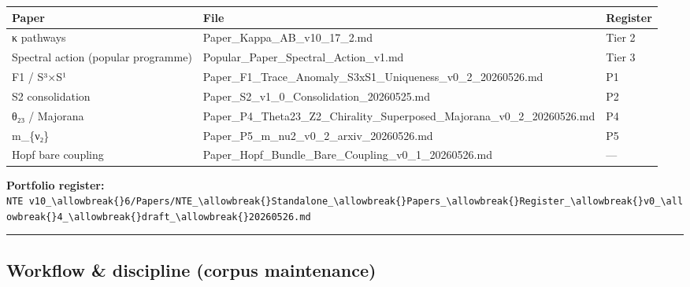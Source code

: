 \documentclass[
  11pt,
]{article}
\newcounter{none} %
\begin{document}
{\def\LTcaptype{none} %
\begin{longtable}[]{@{}
  >{\raggedright\arraybackslash}p{}
  >{\raggedright\arraybackslash}p{}
  >{\raggedright\arraybackslash}p{}@{}}
\toprule\noalign{}
\begin{minipage}[b]{\linewidth}\raggedright
Paper
\end{minipage} & \begin{minipage}[b]{\linewidth}\raggedright
File
\end{minipage} & \begin{minipage}[b]{\linewidth}\raggedright
Register
\end{minipage} \\
\midrule\noalign{}
\endhead
\bottomrule\noalign{}
\endlastfoot
κ pathways & Paper\_Kappa\_AB\_v10\_17\_2.md & Tier 2 \\
Spectral action (popular programme) &
Popular\_Paper\_Spectral\_Action\_v1.md & Tier 3 \\
F1 / S³×S¹ &
Paper\_F1\_Trace\_Anomaly\_S3xS1\_Uniqueness\_v0\_2\_20260526.md & P1 \\
S2 consolidation & Paper\_S2\_v1\_0\_Consolidation\_20260525.md & P2 \\
θ₂₃ / Majorana &
Paper\_P4\_Theta23\_Z2\_Chirality\_Superposed\_Majorana\_v0\_2\_20260526.md
& P4 \\
m\_\{ν₂\} & Paper\_P5\_m\_nu2\_v0\_2\_arxiv\_20260526.md & P5 \\
Hopf bare coupling &
Paper\_Hopf\_Bundle\_Bare\_Coupling\_v0\_1\_20260526.md & --- \\
\end{longtable}
}

\textbf{Portfolio register:}
\texttt{NTE\ v10\_\textbackslash{}allowbreak\{\}6/Papers/NTE\_\textbackslash{}allowbreak\{\}Standalone\_\textbackslash{}allowbreak\{\}Papers\_\textbackslash{}allowbreak\{\}Register\_\textbackslash{}allowbreak\{\}v0\_\textbackslash{}allowbreak\{\}4\_\textbackslash{}allowbreak\{\}draft\_\textbackslash{}allowbreak\{\}20260526.md}

\begin{center}\rule{0.5\linewidth}{0.5pt}\end{center}

\subsection{Workflow \& discipline (corpus
maintenance)}\label{workflow-discipline-corpus-maintenance}
\end{document}
